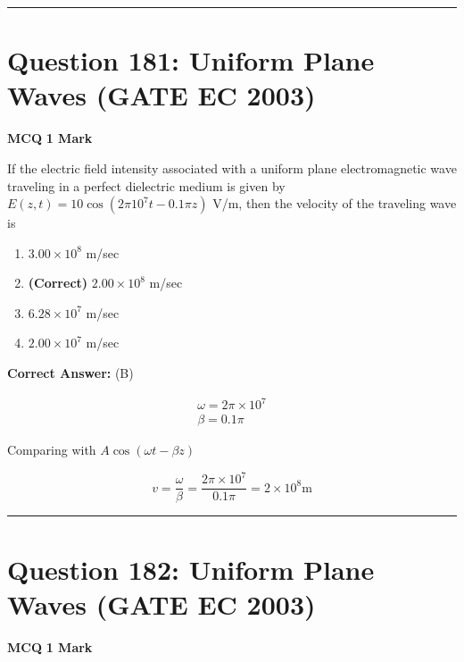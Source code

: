 \documentclass[11pt,a4paper]{article}
\begin{document}
\vspace{1.5em}
\hrule
\vspace{1.5em}

\section*{Question 181: Uniform Plane Waves (GATE EC 2003)}
\noindent \textbf{\color{primary}MCQ} \hfill \textbf{\color{secondary}1 Mark}


\noindent If the electric field intensity associated with a uniform plane electromagnetic wave traveling in a perfect dielectric medium is given by
 $E(z,t)=10\cos (2\pi 10^{7}t-0.1\pi z)$ V/m, then the velocity of the traveling wave is


\begin{enumerate}[label=(\Alph*)]
    \item $3.00\times 10^{8}$ m/sec
    \item \textbf{(Correct)} $2.00\times 10^{8}$ m/sec
    \item $6.28\times 10^{7}$ m/sec
    \item $2.00\times 10^{7}$ m/sec
\end{enumerate}

\noindent \textbf{Correct Answer:} (B)

\begin{tcolorbox}[solbox, title=Detailed Solution -- Question 181]
\[
\begin{array}{l} \omega=2 \pi \times 10^{7} \\ \beta=0.1 \pi \end{array}
\]

 Comparing with $A \cos (\omega t-\beta z)$

\[
v=\frac{\omega}{\beta}=\frac{2 \pi \times 10^{7}}{0.1 \pi}=2 \times 10^{8} \mathrm{m}
\]
\end{tcolorbox}

\vspace{1.5em}
\hrule
\vspace{1.5em}

\section*{Question 182: Uniform Plane Waves (GATE EC 2003)}
\noindent \textbf{\color{primary}MCQ} \hfill \textbf{\color{secondary}1 Mark}
\end{document}

